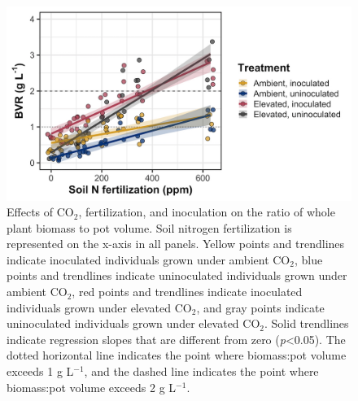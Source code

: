 \newpage
\begin{figure}
    \centering
    \includegraphics[width=\linewidth]{ch5_NxCO2xI/figs/NxCO2xI_figS2_bvr.jpg}
    \caption[Effects of CO$_2$, fertilization, and inoculation on the ratio of whole plant biomass to pot volume]{Effects of CO$_2$, fertilization, and inoculation on the ratio of whole plant biomass to pot volume. Soil nitrogen fertilization is represented on the x-axis in all panels. Yellow points and trendlines indicate inoculated individuals grown under ambient CO$_2$, blue points and trendlines indicate uninoculated individuals grown under ambient CO$_2$, red points and trendlines indicate inoculated individuals grown under elevated CO$_2$, and gray points indicate uninoculated individuals grown under elevated CO$_2$. Solid trendlines indicate regression slopes that are different from zero (\textit{p}<0.05). The dotted horizontal line indicates the point where biomass:pot volume exceeds 1 g L$^{-1}$, and the dashed line indicates the point where biomass:pot volume exceeds 2 g L$^{-1}$.}
    \label{fig:figure.d2}
\end{figure}
\clearpage
